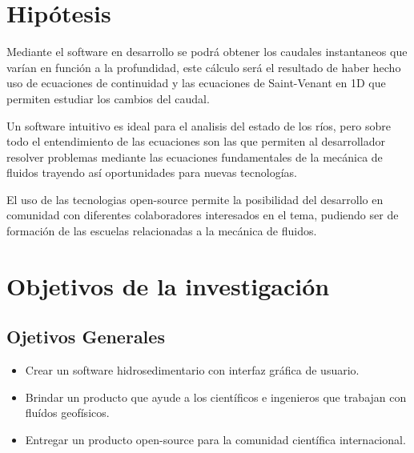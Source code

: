 \documentclass[12pt,a4paper]{report}
\begin{document}
\section{Hipótesis}

Mediante el software en desarrollo se podrá obtener los caudales instantaneos que varían en función a la profundidad, este cálculo será el resultado de haber hecho uso de ecuaciones de continuidad y las ecuaciones de Saint-Venant en 1D que permiten estudiar los cambios del caudal.

Un software intuitivo es ideal para el analisis del estado de los ríos, pero sobre todo el entendimiento de las ecuaciones son las que permiten al desarrollador resolver problemas mediante las ecuaciones fundamentales de la mecánica de fluidos trayendo así oportunidades para nuevas tecnologías.

El uso de las tecnologias open-source permite la posibilidad del desarrollo en comunidad con diferentes colaboradores interesados en el tema, pudiendo ser de formación de las escuelas relacionadas a la mecánica de fluidos.

	\section{Objetivos de la investigación}
	\subsection{Ojetivos Generales}
	\begin{itemize}
	\item Crear un software hidrosedimentario con interfaz gráfica de usuario.
	\item Brindar un producto que ayude a los científicos e ingenieros que trabajan con fluídos geofísicos.
	\item Entregar un producto open-source para la comunidad científica internacional.
	\end{itemize}
\end{document}
